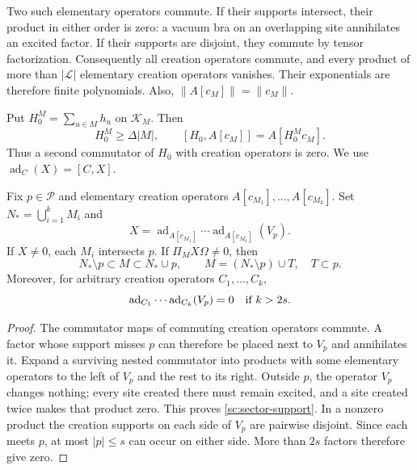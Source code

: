 Two such elementary operators commute. If their supports intersect,
their product in either order is zero: a vacuum bra on an overlapping
site annihilates an excited factor. If their supports are disjoint,
they commute by tensor factorization. Consequently all creation operators
commute, and every product of more than $|\mathcal L|$ elementary creation
operators vanishes. Their exponentials are therefore finite polynomials.
Also, $\|A[c_M]\|=\|c_M\|$.

Put $H_0^M=\sum_{u\in M}h_u$ on $\mathcal K_M$. Then
\begin{equation}
 H_0^M\ge\Delta|M|,
 \qquad [H_0,A[c_M]]=A[H_0^M c_M].
 \label{sc:free-commutator}
\end{equation}
Thus a second commutator of $H_0$ with creation operators is zero.
We use $\operatorname{ad}_C(X)=[C,X]$.

\begin{lemma}
\label{sc:support}
Fix $p\in\mathcal P$ and elementary creation operators
$A[c_{M_1}],\ldots,A[c_{M_k}]$. Set $N_*=\bigcup_{i=1}^kM_i$ and
\[
 X=\operatorname{ad}_{A[c_{M_1}]}\cdots
                   \operatorname{ad}_{A[c_{M_k}]}(V_p).
\]
If $X\ne0$, each $M_i$ intersects $p$. If $\Pi_MX\Omega\ne0$, then
\begin{equation}
 N_*\setminus p\subset M\subset N_*\cup p,
 \qquad M=(N_*\setminus p)\cup T,
 \quad T\subset p.
 \label{sc:sector-support}
\end{equation}
Moreover, for arbitrary creation operators $C_1,\ldots,C_k$,
\begin{equation}
 \operatorname{ad}_{C_1}\cdots\operatorname{ad}_{C_k}(V_p)=0
 \quad\hbox{if }k>2s.
 \label{sc:depth}
\end{equation}
\end{lemma}
\begin{proof}
The commutator maps of commuting creation operators commute. A factor
whose support misses $p$ can therefore be placed next to $V_p$ and
annihilates it. Expand a surviving nested commutator into products with
some elementary operators to the left of $V_p$ and the rest to its right.
Outside $p$, the operator $V_p$ changes nothing; every site created there
must remain excited, and a site created twice makes that product zero.
This proves \eqref{sc:sector-support}. In a nonzero product the creation
supports on each side of $V_p$ are pairwise disjoint. Since each meets
$p$, at most $|p|\le s$ can occur on either side. More than $2s$
factors therefore give zero.
\end{proof}

